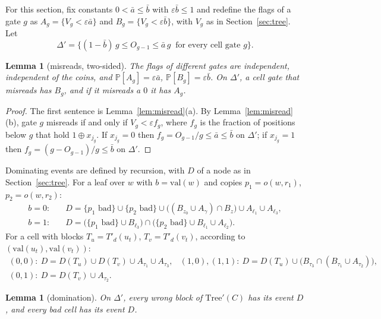 \documentclass[11pt]{amsart}
\newtheorem{lemma}[theorem]{Lemma}
\theoremstyle{definition}
\theoremstyle{remark}
\newcommand{\eps}{\varepsilon}
\newcommand{\val}{\mathrm{val}}
\newcommand{\PP}{\mathbb{P}}
\begin{document}
\noindent For this section, fix constants $0<\bar a\le\bar b$ with $\eps\bar b\le1$ and redefine the flags of a gate
$g$ as $A_g=\{V_g<\eps\bar a\}$ and $B_g=\{V_g<\eps\bar b\}$, with $V_g$ as in
Section~\ref{sec:tree}. Let
\[
\Delta'=\bigl\{(1-\bar b)\,g\le O_{g-1}\le\bar a\,g\ \text{ for every cell gate }g\bigr\}.
\]

\begin{lemma}[misreads, two-sided]\label{lem:misread2}
The flags of different gates are independent, independent of the coins, and
$\PP[A_g]=\eps\bar a$, $\PP[B_g]=\eps\bar b$. On $\Delta'$, a cell gate that misreads has $B_g$, and
if it misreads a $0$ it has $A_g$.
\end{lemma}

\begin{proof}
The first sentence is Lemma~\ref{lem:misread}(a). By Lemma~\ref{lem:misread}(b), gate $g$ misreads
if and only if $V_g<\eps f_g$, where $f_g$ is the fraction of positions below $g$ that hold
$1\oplus x_{j_g}$. If $x_{j_g}=0$ then $f_g=O_{g-1}/g\le\bar a\le\bar b$ on $\Delta'$; if
$x_{j_g}=1$ then $f_g=(g-O_{g-1})/g\le\bar b$ on $\Delta'$.
\end{proof}

\noindent Dominating events are defined by recursion, with $D$ of a node as in
Section~\ref{sec:tree}. For a leaf over $w$ with $b=\val(w)$ and copies $p_1=o(w,r_1)$,
$p_2=o(w,r_2)$:
\begin{align*}
b=0:&\quad D=\{p_1\text{ bad}\}\cup\{p_2\text{ bad}\}\cup\bigl((B_{z_0}\cup A_\gamma)\cap B_z\bigr)\cup A_{\ell_1}\cup A_{\ell_3},\\
b=1:&\quad D=\bigl(\{p_1\text{ bad}\}\cup B_{\ell_3}\bigr)\cap\bigl(\{p_2\text{ bad}\}\cup B_{\ell_1}\cup A_{\ell_2}\bigr).
\end{align*}
For a cell with blocks $T_u=T'_d(u_t)$, $T_v=T'_d(v_t)$, according to $(\val(u_t),\val(v_t))$:
\[
\begin{array}{ll}
(0,0):\ D=D(T_u)\cup D(T_v)\cup A_{\tau_1}\cup A_{\tau_3}, & (1,0),(1,1):\ D=D(T_u)\cup\bigl(B_{\tau_3}\cap(B_{\tau_1}\cup A_{\tau_2})\bigr),\\[2pt]
(0,1):\ D=D(T_v)\cup A_{\tau_2}.
\end{array}
\]

\begin{lemma}[domination]\label{lem:dom2}
On $\Delta'$, every wrong block of $\mathrm{Tree}'(C)$ has its event $D$, and every bad cell has
its event $D$.
\end{lemma}
\end{document}
